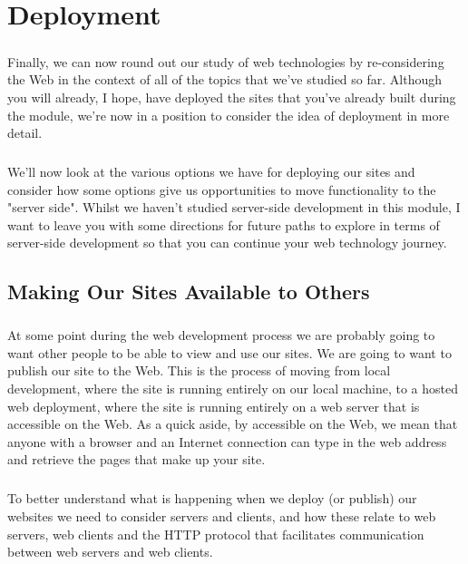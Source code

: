 \chapter{Deployment}
\label{deployment}
\paragraph{} Finally, we can now round out our study of web technologies by re-considering the Web in the context of all of the topics that we've studied so far. Although you will already, I hope, have deployed the sites that you've already built during the module, we're now in a position to consider the idea of deployment in more detail.
\paragraph{} We'll now look at the various options we have for deploying our sites and consider how some options give us opportunities to move functionality to the "server side". Whilst we haven't studied server-side development in this module, I want to leave you with some directions for future paths to explore in terms of server-side development so that you can continue your web technology journey.

\section{Making Our Sites Available to Others}
\paragraph{} At some point during the web development process we are probably going to want other people to be able to view and use our sites. We are going to want to publish our site to the Web. This is the process of moving from local development, where the site is running entirely on our local machine, to a hosted web deployment, where the site is running entirely on a web server that is accessible on the Web. As a quick aside, by accessible on the Web, we mean that anyone with a browser and an Internet connection can type in the web address and retrieve the pages that make up your site.
\paragraph{} To better understand what is happening when we deploy (or publish) our websites we need to consider servers and clients, and how these relate to web servers, web clients and the HTTP protocol that facilitates communication between web servers and web clients.

